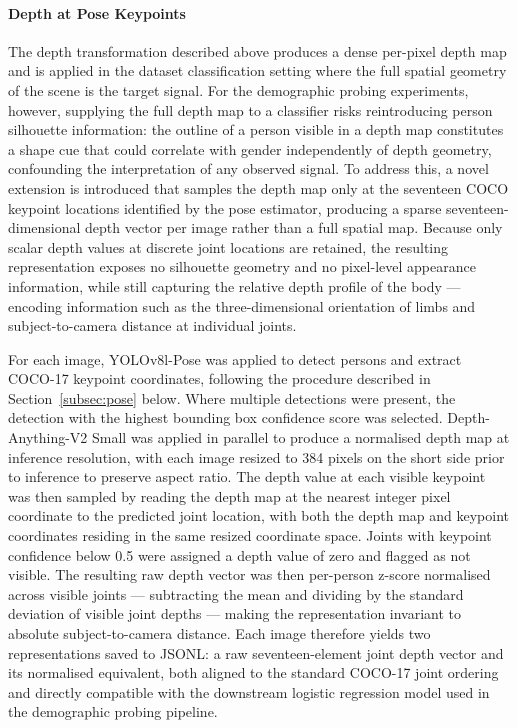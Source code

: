\paragraph{Depth at Pose Keypoints}
The depth transformation described above produces a dense per-pixel depth map 
and is applied in the dataset classification setting where the full spatial 
geometry of the scene is the target signal. For the demographic probing 
experiments, however, supplying the full depth map to a classifier risks 
reintroducing person silhouette information: the outline of a person visible 
in a depth map constitutes a shape cue that could correlate with gender 
independently of depth geometry, confounding the interpretation of any 
observed signal. To address this, a novel extension is introduced that samples 
the depth map only at the seventeen COCO keypoint locations identified by the 
pose estimator, producing a sparse seventeen-dimensional depth vector per 
image rather than a full spatial map. Because only scalar depth values at 
discrete joint locations are retained, the resulting representation exposes no 
silhouette geometry and no pixel-level appearance information, while still 
capturing the relative depth profile of the body — encoding information such 
as the three-dimensional orientation of limbs and subject-to-camera distance 
at individual joints.

For each image, YOLOv8l-Pose was applied to detect persons and extract 
COCO-17 keypoint coordinates, following the procedure described in 
Section~\ref{subsec:pose} below. Where multiple detections were present, the 
detection with the highest bounding box confidence score was selected. 
Depth-Anything-V2 Small was applied in parallel to produce a normalised depth 
map at inference resolution, with each image resized to 384 pixels on the 
short side prior to inference to preserve aspect ratio. The depth value at 
each visible keypoint was then sampled by reading the depth map at the nearest 
integer pixel coordinate to the predicted joint location, with both the depth 
map and keypoint coordinates residing in the same resized coordinate space. 
Joints with keypoint confidence below 0.5 were assigned a depth value of zero 
and flagged as not visible. The resulting raw depth vector was then 
per-person z-score normalised across visible joints — subtracting the mean and 
dividing by the standard deviation of visible joint depths — making the 
representation invariant to absolute subject-to-camera distance. Each image 
therefore yields two representations saved to JSONL: a raw seventeen-element 
joint depth vector and its normalised equivalent, both aligned to the standard 
COCO-17 joint ordering and directly compatible with the downstream logistic 
regression model used in the demographic probing pipeline.

